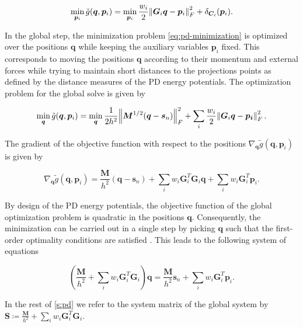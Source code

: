 \begin{equation}\label{eq:pd-local-minimization}
    \min_{\bm{p}_i} \tilde{g}(\bm{q}, \bm{p}_i) =
    \min_{\bm{p}_i} \frac{w_i}{2}\norm{\bm{G}_i\bm{q} - \bm{p}_i}^2_F + \delta_{\bm{C}_i}(\bm{p}_i).
\end{equation}

In the global step, the minimization problem \cref{eq:pd-minimization} is optimized over the positions $\bm{q}$ while keeping the auxiliary 
variables $\bm{p}_i$ fixed.
This corresponds to moving the positions $\bm{q}$ according to their momentum and external forces while trying to maintain short distances
to the projections points as defined by the distance measures of the PD energy potentials. The optimization problem for the global solve is 
given by

\begin{equation}\label{eq:pd-global-minimization}
    \min_{\bm{q}} \tilde{g}(\bm{q}, \bm{p}_i) =
    \min_{\bm{q}} \frac{1}{2h^2} \norm{\bm{M}^{1/2}(\bm{q} - \bm{s}_n)}^2_F + \sum_i \frac{w_i}{2} \norm{\bm{G}_i\bm{q} - \bm{p_i}}^2_F.
\end{equation}

\noindent The gradient of the objective function with respect to the positions $\nabla_{\bm{q}} 
\tilde{g}(\bm{q}, \bm{p}_i)$ is given by 

\begin{equation}\label{eq:pd-gradient-q}
    \nabla_{\bm{q}}\tilde{g}(\bm{q}, \bm{p}_i) = \frac{\bm{M}}{h^2}(\bm{q} - \bm{s}_n) + \sum_i w_i \bm{G}^T_i \bm{G}_i \bm{q}
    + \sum_i w_i \bm{G}^T_i \bm{p}_i.
\end{equation}

\noindent By design of the PD energy potentials, the objective function of the global optimization problem is quadratic in the positions 
$\bm{q}$. Consequently, the minimization can be carried out in a single step by picking $\bm{q}$ such that the first-order optimality 
conditions are satisfied \cite{nocedal2006}. This leads to the following system of equations

\begin{equation}\label{eq:pd-global-system}
    (\frac{\bm{M}}{h^2} + \sum_i w_i \bm{G}_i^T \bm{G}_i)\bm{q} = \frac{\bm{M}}{h^2}\bm{s}_n + \sum_i w_i \bm{G}_i^T \bm{p}_i.
\end{equation}

\noindent In the rest of \cref{s:pd} we refer to the system matrix of the global system by 
$\bm{S} \coloneqq \frac{\bm{M}}{h^2} + \sum_i w_i \bm{G}_i^T \bm{G}_i$.

